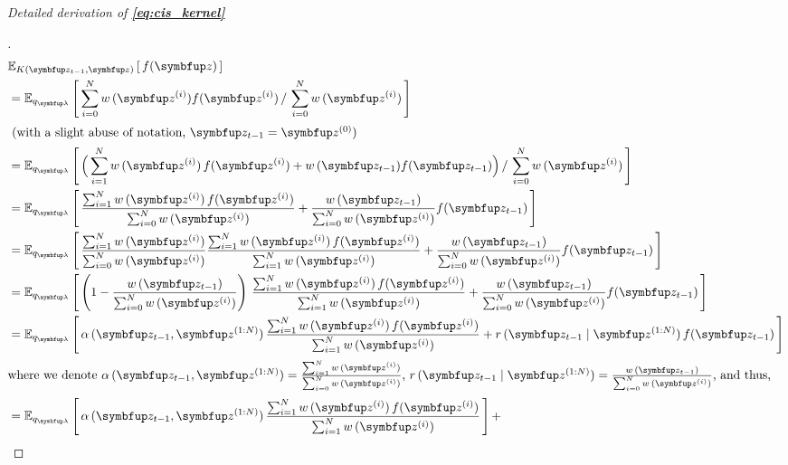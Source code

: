 

\textit{Detailed derivation of \textbf{\cref{eq:cis_kernel}}}
\begin{proof}[\unskip\nopunct]
\begin{align}
  &\Esub{K(\vz_{t-1}, \vz)}{f(\vz)} \\
  &= \Esub{q_{\vlambda}}{
      \sum^{N}_{i=0} w\,(\vz^{(i)}) f(\vz^{(i)}) 
      \,/\,
      \sum^{N}_{i=0} w\,(\vz^{(i)})
  } \\
  \intertext{
    (with a slight abuse of notation, \(\vz_{t-1} = \vz^{(0)}\))
  }
  &= \Esub{q_{\vlambda}}{
    \Big(
    \sum^{N}_{i=1} w\,(\vz^{(i)})\,f(\vz^{(i)}) + w\,(\vz_{t-1}) f(\vz_{t-1})
    \Big)
      \,/\,
      \sum^{N}_{i=0} w\,(\vz^{(i)})
  } \\
  &= \Esub{q_{\vlambda}}{
    \frac{
      \sum^{N}_{i=1} w\,(\vz^{(i)})\,f(\vz^{(i)})
    }
    {
      \sum^{N}_{i=0} w\,(\vz^{(i)})
    }
    +
    \frac{w\,(\vz_{t-1})}{\sum^{N}_{i=0} w\,(\vz^{(i)})} f(\vz_{t-1})
  } \\
  &= \Esub{q_{\vlambda}}{
    \frac{
      \sum^{N}_{i=1} w\,(\vz^{(i)})  
    }
    {
      \sum^{N}_{i=0} w\,(\vz^{(i)})  
    }
    \frac{
      \sum^{N}_{i=1} w\,(\vz^{(i)})\,f(\vz^{(i)})
    }
    {
      \sum^{N}_{i=1} w\,(\vz^{(i)})
    }
    +
    \frac{w\,(\vz_{t-1})}{\sum^{N}_{i=0} w\,(\vz^{(i)})} f(\vz_{t-1})
  } \\
  &= \Esub{q_{\vlambda}}{
    \left(
    1 - \frac{
       w\,(\vz_{t-1}) 
    }
    {
      \sum^{N}_{i=0} w\,(\vz^{(i)})  
    }
    \right)\,
    \frac{
      \sum^{N}_{i=1} w\,(\vz^{(i)})\,f(\vz^{(i)})
    }
    {
      \sum^{N}_{i=1} w\,(\vz^{(i)})
    }
    +
    \frac{w\,(\vz_{t-1})}{\sum^{N}_{i=0} w\,(\vz^{(i)})} f(\vz_{t-1})
  } \\
  &= \Esub{q_{\vlambda}}{
    \alpha\,(\vz_{t-1}, \vz^{(1:N)}) \,
    \frac{
      \sum^{N}_{i=1} w\,(\vz^{(i)})\,f(\vz^{(i)})
    }
    {
      \sum^{N}_{i=1} w\,(\vz^{(i)})
    }
    +
    r\,(\vz_{t-1}\mid\vz^{(1:N)}) \, f(\vz_{t-1})
  }\label{eq:cis_kernel_inter} \\ 
  \intertext{where we denote
    \(
    \alpha\,(\vz_{t-1}, \vz^{(1:N)}) =
    \frac{
      \sum^{N}_{i=1} w\,(\vz^{(i)})  
    }
    {
      \sum^{N}_{i=0} w\,(\vz^{(i)})  
    }
  \),
  \(
  r\,(\vz_{t-1}\mid\vz^{(1:N)}) = \frac{w\,(\vz_{t-1})}{\sum^{N}_{i=0} w\,(\vz^{(i)})}
  \), and thus,
  }
%
  &= \Esub{q_{\vlambda}}{
    \alpha\,(\vz_{t-1}, \vz^{(1:N)}) \,
    \frac{
      \sum^{N}_{i=1} w\,(\vz^{(i)})\,f(\vz^{(i)})
    }
    {
      \sum^{N}_{i=1} w\,(\vz^{(i)})
    }
  }
    +

\end{align}
\end{proof}
